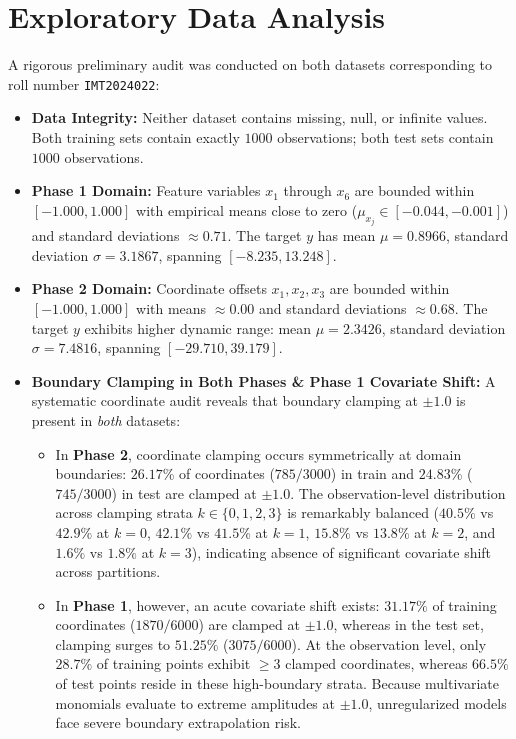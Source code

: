 \documentclass[10pt,twocolumn]{article}
\begin{document}
\section{Exploratory Data Analysis}
A rigorous preliminary audit was conducted on both datasets corresponding to roll number \texttt{IMT2024022}:
\begin{itemize}\setlength{\itemsep}{1pt}
    \item \textbf{Data Integrity:} Neither dataset contains missing, null, or infinite values. Both training sets contain exactly $1000$ observations; both test sets contain $1000$ observations.
    \item \textbf{Phase 1 Domain:} Feature variables $x_1$ through $x_6$ are bounded within $[-1.000, 1.000]$ with empirical means close to zero ($\mu_{x_j} \in [-0.044, -0.001]$) and standard deviations $\approx 0.71$. The target $y$ has mean $\mu = 0.8966$, standard deviation $\sigma = 3.1867$, spanning $[-8.235, 13.248]$.
    \item \textbf{Phase 2 Domain:} Coordinate offsets $x_1, x_2, x_3$ are bounded within $[-1.000, 1.000]$ with means $\approx 0.00$ and standard deviations $\approx 0.68$. The target $y$ exhibits higher dynamic range: mean $\mu = 2.3426$, standard deviation $\sigma = 7.4816$, spanning $[-29.710, 39.179]$.
    \item \textbf{Boundary Clamping in Both Phases \& Phase 1 Covariate Shift:} A systematic coordinate audit reveals that boundary clamping at $\pm 1.0$ is present in \emph{both} datasets:
    \begin{itemize}\setlength{\itemsep}{1pt}
        \item In \textbf{Phase 2}, coordinate clamping occurs symmetrically at domain boundaries: $26.17\%$ of coordinates ($785/3000$) in train and $24.83\%$ ($745/3000$) in test are clamped at $\pm 1.0$. The observation-level distribution across clamping strata $k \in \{0, 1, 2, 3\}$ is remarkably balanced ($40.5\%$ vs $42.9\%$ at $k=0$, $42.1\%$ vs $41.5\%$ at $k=1$, $15.8\%$ vs $13.8\%$ at $k=2$, and $1.6\%$ vs $1.8\%$ at $k=3$), indicating absence of significant covariate shift across partitions.
        \item In \textbf{Phase 1}, however, an acute covariate shift exists: $31.17\%$ of training coordinates ($1870/6000$) are clamped at $\pm 1.0$, whereas in the test set, clamping surges to $51.25\%$ ($3075/6000$). At the observation level, only $28.7\%$ of training points exhibit $\ge 3$ clamped coordinates, whereas $66.5\%$ of test points reside in these high-boundary strata. Because multivariate monomials evaluate to extreme amplitudes at $\pm 1.0$, unregularized models face severe boundary extrapolation risk.
    \end{itemize}
\end{itemize}
\end{document}
